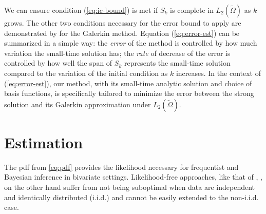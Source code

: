 We can ensure condition (\ref{eq:ic-bound}) is met if $S_k$ is
complete in $L_2(\tilde{\Omega})$ as $k$ grows. The other two conditions
necessary for the error bound to apply are demonstrated by
\cite{bramble1977some} for the Galerkin method. Equation
(\ref{eq:error-est}) can be summarized in a simple way: the
\textit{error} of the method is controlled by how much variation the
small-time solution has; the \textit{rate} of decrease of the error is
controlled by how well the span of $S_k$ represents the small-time
solution compared to the variation of the initial condition as $k$
increases. In the context of (\ref{eq:error-est}), our method, with
its small-time analytic solution and choice of basis functions, is
specifically tailored to minimize the error between the strong
solution and its Galerkin approximation under $L_2(\tilde{\Omega})$.



\section{Estimation}
The pdf from \eqref{eq:pdf} provides the likelihood
necessary for frequentist and Bayesian inference in bivariate
settings.  Likelihood-free approaches, like that of
\cite{rogers1991estimating}, \cite{rogers2008estimating}, on the other
hand suffer from not being suboptimal when data are independent and
identically distributed (i.i.d.) and cannot be easily extended to the
non-i.i.d. case.

